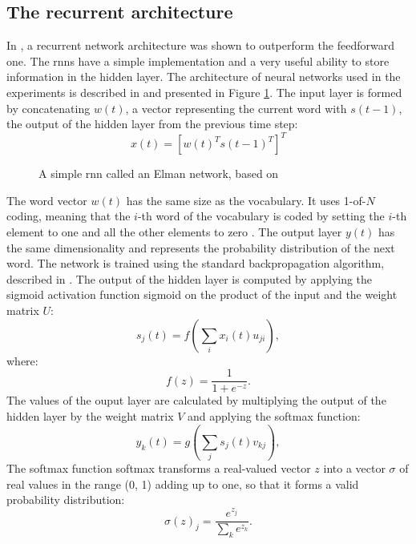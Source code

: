 	\subsection{The recurrent architecture}
	In \cite{mikolov2011extensions}, a recurrent network architecture was shown to outperform the feedforward one. The \glspl{rnn} have a simple implementation and a very useful ability to store information in the hidden layer. The architecture of neural networks used in the experiments is described in \cite{mikolov2010recurrent} and presented in Figure \ref{figure:recurrent}. The input layer is formed by concatenating $w(t)$, a vector representing the current word with $s(t-1)$, the output of the hidden layer from the previous time step:
	\begin{equation}
		x(t)=[w(t)^{T}s(t-1)^{T}]^{T}
		\label{equation:word_vector}
	\end{equation}

	\begin{figure}[htbp]
		\centering
		
		\caption{A simple \gls{rnn} called an Elman network, based on \cite{mikolov2011extensions}}
		\label{figure:recurrent}
	\end{figure}
	The word vector $w(t)$ has the same size as the vocabulary. It uses 1-of-$N$ coding, meaning that the $i$-th word of the vocabulary is coded by setting the $i$-th element to one and all the other elements to zero \cite{schwenk2005training}. The output layer $y(t)$ has the same dimensionality and represents the probability distribution of the next word. The network is trained using the standard backpropagation algorithm, described in \cite{rumelhart1988learning}. The output of the hidden layer is computed by applying the sigmoid activation function \gls{sigmoid} on the product of the input and the weight matrix $U$:
	\begin{equation}
		s_{j}(t)=f(\sum_{i}x_{i}(t)u_{ji}),
		\label{equation:hidden}
	\end{equation}
where:
\begin{equation}
	f(z)=\frac{1}{1+e^{-z}}.
	\label{equation:sigmoid}
\end{equation}
The values of the ouput layer are calculated by multiplying the output of the hidden layer by the weight matrix $V$ and applying the softmax function:
\begin{equation}
	y_{k}(t)=g(\sum_{j}s_{j}(t)v_{kj}),
	\label{equation:output}
\end{equation}
The softmax function \gls{softmax} transforms a real-valued vector $z$ into a vector $\sigma$ of real values in the range (0, 1) adding up to one, so that it forms a valid probability distribution:
\begin{equation}
	\sigma(z)_{j}=\frac{e^{z_{j}}}{\sum_{k}e^{z_{k}}}.
	\label{equation:softmax}
\end{equation}

